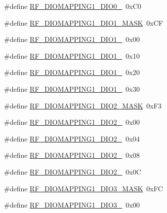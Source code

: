 \begin{DoxyCompactItemize}
\item 
\#define \mbox{\hyperlink{sx1276_regs-_fsk_8h_a9ff81336dba9556766eab5557d307c61}{R\+F\+\_\+\+D\+I\+O\+M\+A\+P\+P\+I\+N\+G1\+\_\+\+D\+I\+O0\+\_}}~0x\+C0
\item 
\#define \mbox{\hyperlink{sx1276_regs-_fsk_8h_aa92615e9def963f8881f657746524eac}{R\+F\+\_\+\+D\+I\+O\+M\+A\+P\+P\+I\+N\+G1\+\_\+\+D\+I\+O1\+\_\+\+M\+A\+SK}}~0x\+CF
\item 
\#define \mbox{\hyperlink{sx1276_regs-_fsk_8h_abd43e3d4350c26e574afbde538b06ad6}{R\+F\+\_\+\+D\+I\+O\+M\+A\+P\+P\+I\+N\+G1\+\_\+\+D\+I\+O1\+\_}}~0x00
\item 
\#define \mbox{\hyperlink{sx1276_regs-_fsk_8h_a0740d4eea50feddedcc9c16f2bea4b46}{R\+F\+\_\+\+D\+I\+O\+M\+A\+P\+P\+I\+N\+G1\+\_\+\+D\+I\+O1\+\_}}~0x10
\item 
\#define \mbox{\hyperlink{sx1276_regs-_fsk_8h_aa3a59a62b71ccad95afea471eb8d51b2}{R\+F\+\_\+\+D\+I\+O\+M\+A\+P\+P\+I\+N\+G1\+\_\+\+D\+I\+O1\+\_}}~0x20
\item 
\#define \mbox{\hyperlink{sx1276_regs-_fsk_8h_a5c6e8e60356b10f7742d5dc73ddd03af}{R\+F\+\_\+\+D\+I\+O\+M\+A\+P\+P\+I\+N\+G1\+\_\+\+D\+I\+O1\+\_}}~0x30
\item 
\#define \mbox{\hyperlink{sx1276_regs-_fsk_8h_a428631edbba8ef725a4a6b3be1b6fb8a}{R\+F\+\_\+\+D\+I\+O\+M\+A\+P\+P\+I\+N\+G1\+\_\+\+D\+I\+O2\+\_\+\+M\+A\+SK}}~0x\+F3
\item 
\#define \mbox{\hyperlink{sx1276_regs-_fsk_8h_a6db6d0433fa092c1c499001f8b5a3a1a}{R\+F\+\_\+\+D\+I\+O\+M\+A\+P\+P\+I\+N\+G1\+\_\+\+D\+I\+O2\+\_}}~0x00
\item 
\#define \mbox{\hyperlink{sx1276_regs-_fsk_8h_a6f88625f3e51cbfacd0c8328d448fce4}{R\+F\+\_\+\+D\+I\+O\+M\+A\+P\+P\+I\+N\+G1\+\_\+\+D\+I\+O2\+\_}}~0x04
\item 
\#define \mbox{\hyperlink{sx1276_regs-_fsk_8h_ad121efc538b9ec91c270343fc829fb36}{R\+F\+\_\+\+D\+I\+O\+M\+A\+P\+P\+I\+N\+G1\+\_\+\+D\+I\+O2\+\_}}~0x08
\item 
\#define \mbox{\hyperlink{sx1276_regs-_fsk_8h_a8f9393d8018c3a4699ac487c2e133a55}{R\+F\+\_\+\+D\+I\+O\+M\+A\+P\+P\+I\+N\+G1\+\_\+\+D\+I\+O2\+\_}}~0x0C
\item 
\#define \mbox{\hyperlink{sx1276_regs-_fsk_8h_a43ae7365b7ce0d2f75e25cd32c48c6e5}{R\+F\+\_\+\+D\+I\+O\+M\+A\+P\+P\+I\+N\+G1\+\_\+\+D\+I\+O3\+\_\+\+M\+A\+SK}}~0x\+FC
\item 
\#define \mbox{\hyperlink{sx1276_regs-_fsk_8h_ae678538a0f95f5fece5e9bf1e81a5a86}{R\+F\+\_\+\+D\+I\+O\+M\+A\+P\+P\+I\+N\+G1\+\_\+\+D\+I\+O3\+\_}}~0x00

\end{DoxyCompactItemize}
